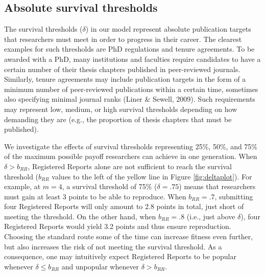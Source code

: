 \documentclass[
  ,man,mask,floatsintext]{apa6}
\begin{document}
\hypertarget{absolute-survival-thresholds}{%
\subsection{Absolute survival thresholds}\label{absolute-survival-thresholds}}

The survival thresholds (\(\delta\)) in our model represent absolute publication targets that researchers must meet in order to progress in their career.
The clearest examples for such thresholds are PhD regulations and tenure agreements.
To be awarded with a PhD, many institutions and faculties require candidates to have a certain number of their thesis chapters published in peer-reviewed journals.
Similarly, tenure agreements may include publication targets in the form of a minimum number of peer-reviewed publications within a certain time, sometimes also specifying minimal journal ranks (Liner \& Sewell, 2009).
Such requirements may represent low, medium, or high survival thresholds depending on how demanding they are (e.g., the proportion of thesis chapters that must be published).

We investigate the effects of survival thresholds representing 25\%, 50\%, and 75\% of the maximum possible payoff researchers can achieve in one generation.
When \(\delta > b_{RR}\), Registered Reports alone are not sufficient to reach the survival threshold (\(b_{RR}\) values to the left of the yellow line in Figure \ref{fig:deltaplot}).
For example, at \(m = 4\), a survival threshold of 75\% (\(\delta = .75\)) means that researchers must gain at least 3 points to be able to reproduce.
When \(b_{RR} = .7\), submitting four Registered Reports will only amount to 2.8 points in total, just short of meeting the threshold.
On the other hand, when \(b_{RR} = .8\) (i.e., just above \(\delta\)), four Registered Reports would yield 3.2 points and thus ensure reproduction.
Choosing the standard route some of the time can increase fitness even further, but also increases the risk of not meeting the survival threshold.
As a consequence, one may intuitively expect Registered Reports to be popular whenever \(\delta \leq b_{RR}\) and unpopular whenever \(\delta > b_{RR}\).
\end{document}
